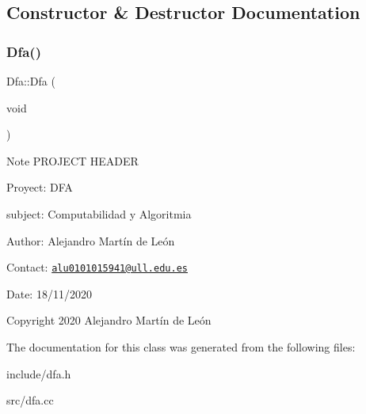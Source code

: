 \subsection{Constructor \& Destructor Documentation}
\mbox{\label{classDfa_a89c2bffef86525363c275b3fe60fc57f}} 
\subsubsection{\texorpdfstring{Dfa()}{Dfa()}}
{\footnotesize\ttfamily Dfa\+::\+Dfa (\begin{DoxyParamCaption}\item[{void}]{ }\end{DoxyParamCaption})}

\begin{DoxyNote}{Note}
P\+R\+O\+J\+E\+CT H\+E\+A\+D\+ER 

Proyect\+: D\+FA 

subject\+: Computabilidad y Algoritmia 

Author\+: Alejandro Martín de León 

Contact\+: \href{mailto:alu0101015941@ull.edu.es}{\tt alu0101015941@ull.\+edu.\+es} 

Date\+: 18/11/2020 

Copyright 2020 Alejandro Martín de León 
\end{DoxyNote}


The documentation for this class was generated from the following files\+:\begin{DoxyCompactItemize}
\item 
include/dfa.\+h\item 
src/dfa.\+cc\end{DoxyCompactItemize}
